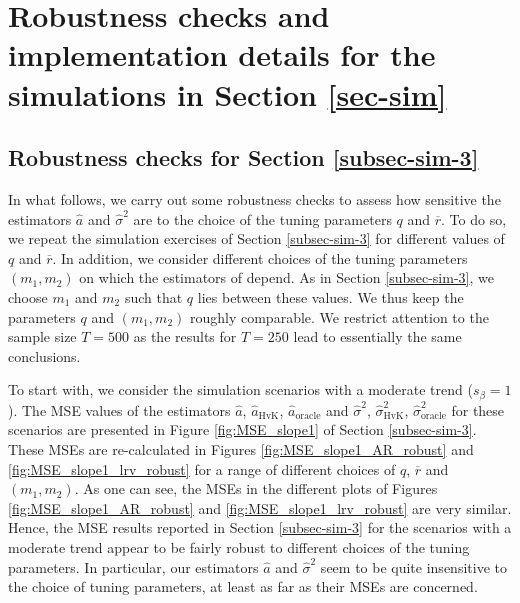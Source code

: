 \section{Robustness checks and implementation details for the simulations in Section \ref{sec-sim}}\label{sec-supp-sim}

\subsection*{Robustness checks for Section \ref{subsec-sim-3}}


In what follows, we carry out some robustness checks to assess how sensitive the estimators $\widehat{a}$ and $\widehat{\sigma}^2$ are to the choice of the tuning parameters $q$ and $\overline{r}$. To do so, we repeat the simulation exercises of Section \ref{subsec-sim-3} for different values of $q$ and $\overline{r}$. In addition, we consider different choices of the tuning parameters $(m_1,m_2)$ on which the estimators of \cite{Hall2003} depend. As in Section \ref{subsec-sim-3}, we choose $m_1$ and $m_2$ such that $q$ lies between these values. We thus keep the parameters $q$ and $(m_1,m_2)$ roughly comparable. We restrict attention to the sample size $T=500$ as the results for $T=250$ lead to essentially the same conclusions. 


To start with, we consider the simulation scenarios with a moderate trend ($s_\beta = 1$). The MSE values of the estimators $\widehat{a}$, $\widehat{a}_{\text{HvK}}$, $\widehat{a}_{\text{oracle}}$ and $\widehat{\sigma}^2$, $\widehat{\sigma}^2_{\text{HvK}}$, $\widehat{\sigma}^2_{\text{oracle}}$ for these scenarios are presented in Figure \ref{fig:MSE_slope1} of Section \ref{subsec-sim-3}. These MSEs are re-calculated in Figures \ref{fig:MSE_slope1_AR_robust} and \ref{fig:MSE_slope1_lrv_robust} for a range of different choices of $q$, $\overline{r}$ and $(m_1,m_2)$. As one can see, the MSEs in the different plots of Figures \ref{fig:MSE_slope1_AR_robust} and \ref{fig:MSE_slope1_lrv_robust} are very similar. Hence, the MSE results reported in Section \ref{subsec-sim-3} for the scenarios with a moderate trend appear to be fairly robust to different choices of the tuning parameters. In particular, our estimators $\widehat{a}$ and $\widehat{\sigma}^2$ seem to be quite insensitive to the choice of tuning parameters, at least as far as their MSEs are concerned.



